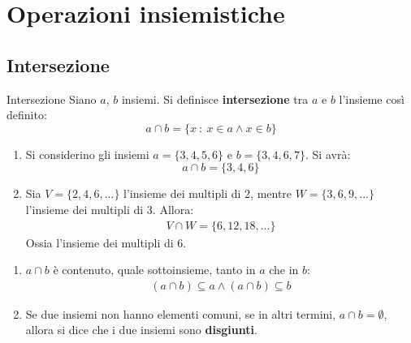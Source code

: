 \section{Operazioni insiemistiche}\label{insiemi:formule}
\subsection{Intersezione}
\begin{defbox}{Intersezione}
	Siano $a$, $b$ insiemi. Si definisce \textbf{intersezione} tra $a$ e $b$ l'insieme così definito:
	\begin{equation}
		a \cap b = \{ x\ : \ x \in a \land x \in b \}
	\end{equation}
\end{defbox}
\begin{center}
	\def\firstcircle{(0,0) circle (1.5cm)}
	\def\secondcircle{(0:2cm) circle (1.5cm)}
	\setlength{\parskip}{5mm}
\end{center}

\begin{example}
	\begin{enumerate}
	\item Si considerino gli insiemi $a=\{3,4,5,6\}$ e $b=\{3,4,6,7\}$. Si avrà:
	\begin{displaymath}
		a \cap b = \{3,4,6\}
	\end{displaymath}
\item Sia $V=\{2,4,6,...\}$ l'insieme dei multipli di 2, mentre $W=\{3,6,9,...\}$ l'insieme dei multipli di 3. Allora:
\begin{align*}
	V \cap W = \{6,12,18,...\}
\end{align*}
Ossia l'insieme dei multipli di 6.
	\end{enumerate}
\end{example}
\begin{osservation}
\begin{enumerate}
	\item $a \cap b$ è contenuto, quale sottoinsieme, tanto in $a$ che in $b$:
	\begin{align*}
		(a \cap b) \subseteq a \land (a \cap b) \subseteq b
	\end{align*}

	\item Se due insiemi non hanno elementi comuni, se in altri termini, $a \cap b = \emptyset$, allora si dice che i due insiemi sono \textbf{disgiunti}.
\end{enumerate}
\end{osservation}

